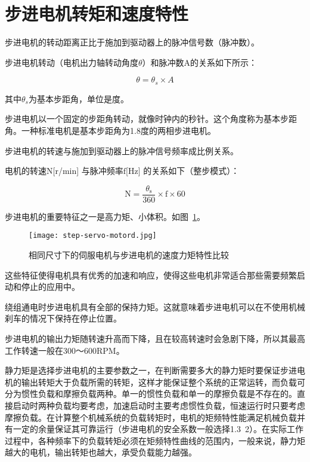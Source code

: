 \section{步进电机转矩和速度特性}

步进电机的转动距离正比于施加到驱动器上的脉冲信号数（脉冲数）。

步进电机转动（电机出力轴转动角度$\theta$）和脉冲数A的关系如下所示：

\begin{equation}
    \theta=\theta_{s} \times A
\end{equation}

其中$\theta_{s}$为基本步距角，单位是度。

步进电机以一个固定的步距角转动，就像时钟内的秒针。这个角度称为基本步距角。一种标准电机是基本步距角为1.8度的两相步进电机。

步进电机的转速与施加到驱动器上的脉冲信号频率成比例关系。

电机的转速$\mathrm{N}$[r/min] 与脉冲频率$\mathrm{f}$[Hz] 的关系如下（整步模式）：

\begin{equation}
    \mathrm{N}=\frac{\theta_{\mathrm{s}}}{360} \times \mathrm{f} \times 60
\end{equation}

步进电机的重要特征之一是高力矩、小体积。如图~\ref{fig:step-servo-motord}。

\begin{figure}[htbp]
    \centering
    \texttt{[image: step-servo-motord.jpg]}
    \caption{相同尺寸下的伺服电机与步进电机的速度力矩特性比较}
    \label{fig:step-servo-motord}
\end{figure}

这些特征使得电机具有优秀的加速和响应，使得这些电机非常适合那些需要频繁启动和停止的应用中。

绕组通电时步进电机具有全部的保持力矩。这就意味着步进电机可以在不使用机械刹车的情况下保持在停止位置。

步进电机的输出力矩随转速升高而下降，且在较高转速时会急剧下降，所以其最高工作转速一般在300～600RPM。

静力矩是选择步进电机的主要参数之一，在判断需要多大的静力矩时要保证步进电机的输出转矩大于负载所需的转矩，这样才能保证整个系统的正常运转，而负载可分为惯性负载和摩擦负载两种。单一的惯性负载和单一的摩擦负载是不存在的。直接启动时两种负载均要考虑，加速启动时主要考虑惯性负载，恒速运行时只要考虑摩擦负载。在计算整个机械系统的负载转矩时，电机的矩频特性能满足机械负载并有一定的余量保证其可靠运行（步进电机的安全系数一般选择1.3~2）。在实际工作过程中，各种频率下的负载转矩必须在矩频特性曲线的范围内，一般来说，静力矩越大的电机，输出转矩也越大，承受负载能力越强。


